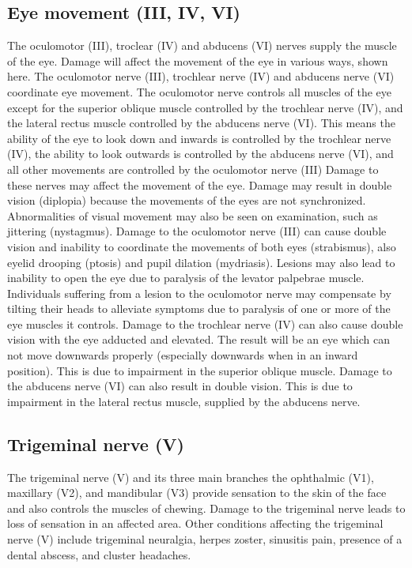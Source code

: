 \hypertarget{eye-movement-iii-iv-vi}{%
\subsection{Eye movement (III, IV, VI)}\label{eye-movement-iii-iv-vi}}

The oculomotor (III), troclear (IV) and abducens (VI) nerves supply the muscle of the eye. Damage will affect the movement of the eye in various ways, shown here. The oculomotor nerve (III), trochlear nerve (IV) and abducens nerve (VI) coordinate eye movement. The oculomotor nerve controls all muscles of the eye except for the superior oblique muscle controlled by the trochlear nerve (IV), and the lateral rectus muscle controlled by the abducens nerve (VI). This means the ability of the eye to look down and inwards is controlled by the trochlear nerve (IV), the ability to look outwards is controlled by the abducens nerve (VI), and all other movements are controlled by the oculomotor nerve (III) Damage to these nerves may affect the movement of the eye. Damage may result in double vision (diplopia) because the movements of the eyes are not synchronized. Abnormalities of visual movement may also be seen on examination, such as jittering (nystagmus). Damage to the oculomotor nerve (III) can cause double vision and inability to coordinate the movements of both eyes (strabismus), also eyelid drooping (ptosis) and pupil dilation (mydriasis). Lesions may also lead to inability to open the eye due to paralysis of the levator palpebrae muscle. Individuals suffering from a lesion to the oculomotor nerve may compensate by tilting their heads to alleviate symptoms due to paralysis of one or more of the eye muscles it controls.
Damage to the trochlear nerve (IV) can also cause double vision with the eye adducted and elevated. The result will be an eye which can not move downwards properly (especially downwards when in an inward position). This is due to impairment in the superior oblique muscle. Damage to the abducens nerve (VI) can also result in double vision. This is due to impairment in the lateral rectus muscle, supplied by the abducens nerve.

\hypertarget{trigeminal-nerve-v}{%
\subsection{Trigeminal nerve (V)}\label{trigeminal-nerve-v}}

The trigeminal nerve (V) and its three main branches the ophthalmic (V1), maxillary (V2), and mandibular (V3) provide sensation to the skin of the face and also controls the muscles of chewing. Damage to the trigeminal nerve leads to loss of sensation in an affected area. Other conditions affecting the trigeminal nerve (V) include trigeminal neuralgia, herpes zoster, sinusitis pain, presence of a dental abscess, and cluster headaches.

